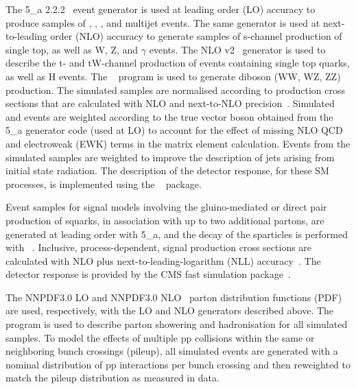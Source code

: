 The {\MADGRAPH{}5\_a\MCATNLO} 2.2.2~\cite{Alwall2014} event generator
is used at leading order (LO) accuracy to produce samples of \wj, \zj,
\ttbar, and multijet events. The same generator is used at
next-to-leading order (NLO) accuracy to generate samples of s-channel
production of single top, as well as {\ttbar}W, {\ttbar}Z, and
{\ttbar}$\gamma$ events. The NLO \POWHEG v2~\cite{powheg,
  powheg_top_Wt} generator is used to describe the t- and tW-channel
production of events containing single top quarks, as well as
{\ttbar}H events. The ~\cite{pythia} program is used to
generate diboson (WW, WZ, ZZ) production. The simulated samples are
normalised according to production cross sections that are calculated
with NLO and next-to-NLO precision~\cite{Alwall2014, wphys, fewz,
  wwxs, top++, nlotop, powheg_top_Wt}. Simulated \wj and \zj events
are weighted according to the true vector boson \Pt obtained from the
{\MADGRAPH{}5\_a\MCATNLO} generator code (used at LO) to account for
the effect of missing NLO QCD and electroweak (EWK) terms in the
matrix element calculation. Events from the \ttbar simulated samples
are weighted to improve the description of jets arising from initial
state radiation. The description of the detector response, for these
SM processes, is implemented using the \GEANTfour~\cite{geant}
package.

Event samples for signal models involving the gluino-mediated or
direct pair production of squarks, in association with up to two
additional partons, are generated at leading order with
{\MADGRAPH{}5\_a\MCATNLO}, and the decay of the sparticles is
performed with ~\cite{pythia}. Inclusive,
process-dependent, signal production cross sections are calculated
with NLO plus next-to-leading-logarithm (NLL)
accuracy~\cite{Beenakker:1996ch, PhysRevLett.102.111802,
  PhysRevD.80.095004, 1126-6708-2009-12-041,
  doi:10.1142/S0217751X11053560, susynlo}. The detector response is
provided by the CMS fast simulation package~\cite{fastsim}.

The \textsc{NNPDF}3.0 LO and \textsc{NNPDF}3.0 NLO~\cite{nnpdf} parton
distribution functions (PDF) are used, respectively, with the LO and
NLO generators described above. The ~\cite{pythia} program
is used to describe parton showering and hadronisation for all
simulated samples. To model the effects of multiple pp collisions
within the same or neighboring bunch crossings (pileup), all simulated
events are generated with a nominal distribution of pp interactions
per bunch crossing and then reweighted to match the pileup
distribution as measured in data.

